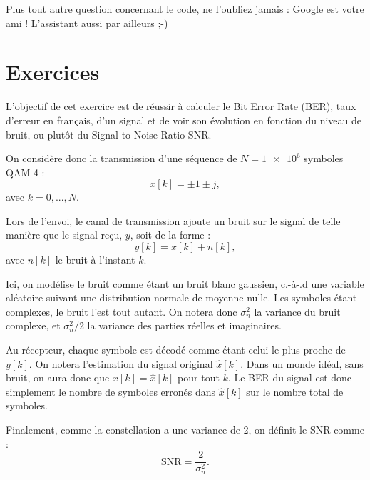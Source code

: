\documentclass [a4paper, 11pt] {article}
\begin{document}
    Plus tout autre question concernant le code, ne l'oubliez jamais : Google est votre ami ! L'assistant aussi par ailleurs ;-)
    
    \pagebreak
    \pagestyle{nextpages}
    \part*{Exercices}
    
    \begin{exercice}{1}
    
        L'objectif de cet exercice est de réussir à calculer le Bit Error Rate (BER), taux d'erreur en français, d'un signal et de voir son évolution en fonction du niveau de bruit, ou plutôt du Signal to Noise Ratio SNR.
        
        On considère donc la transmission d'une séquence de $N=\num{1e6}$ symboles QAM-4 :
        \begin{equation}
            x[k] = \pm 1 \pm j,
        \end{equation}
        avec $k=0,...,N$.
        
        Lors de l'envoi, le canal de transmission ajoute un bruit sur le signal de telle manière que le signal reçu, $y$, soit de la forme :
        \begin{equation}
            y[k] = x[k] + n[k],
        \end{equation}
        avec $n[k]$ le bruit à l'instant $k$.
        
        Ici, on modélise le bruit comme étant un bruit blanc gaussien, c.-à-.d une variable aléatoire suivant une distribution normale de moyenne nulle. Les symboles étant complexes, le bruit l'est tout autant. On notera donc $\sigma_n^2$ la variance du bruit complexe, et $\sigma_n^2/2$ la variance des parties réelles et imaginaires.
        
        Au récepteur, chaque symbole est décodé comme étant celui le plus proche de $y[k]$. On notera l'estimation du signal original $\hat{x}[k]$. Dans un monde idéal, sans bruit, on aura donc que $x[k]=\hat{x}[k]$ pour tout $k$. Le BER du signal est donc simplement le nombre de symboles erronés dans $\hat{x}[k]$ sur le nombre total de symboles.
        
        Finalement, comme la constellation a une variance de 2, on définit le SNR comme :
        \begin{equation}
            \text{SNR} = \frac{2}{\sigma_n^2}.
        \end{equation}
        

\end{exercice}
\end{document}
